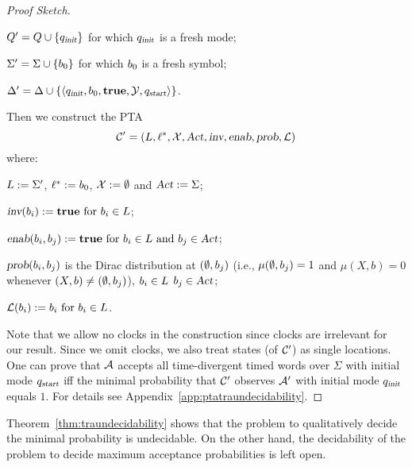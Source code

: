 \begin{proof}[Proof Sketch]
\begin{compactitem}
\item $Q'   = Q  \cup \{ q_{\mbox{\sl\scriptsize init} } \}$ for which $q_{\mbox{\sl\scriptsize init} }$ is a fresh mode;
\item $\Sigma'  = \Sigma \cup \{ b_{0} \}$ for which $b_{0}$ is a fresh symbol;
\item $\Delta'     = \Delta    \cup \{ \langle
            q_{\mbox{\sl\scriptsize init} },
            b_{0},
            \mathbf{true},
            \mathcal{Y},
            q_{\mbox{\sl\scriptsize start}}
        \rangle
    \}$.
\end{compactitem}
Then we construct the PTA
\[
\mathcal{C}'=\left(L, \ell^*, \mathcal{X}, \mbox{\sl Act}, \mbox{\sl inv}, \mbox{\sl enab},  \mbox{\sl prob}, \mathcal{L}\right)
\]
where:
\begin{compactitem}
    \item $L      :=  \Sigma'$, $\ell^*     :=  b_{0} $, $\mathcal{X}    :=  \emptyset $ and $\mbox{\sl Act}      :=  \Sigma $;
    \item $\mbox{\sl inv}(b_{i})              :=  \mathbf{true}
                                            \text{ for }
                                            b_{i} \in L$;
    \item $\mbox{\sl enab}(b_{i},b_{j})   :=  \mathbf{true}
                                            \text{ for }
                                            b_{i} \in L
                                            \text{ and }
                                            b_{j} \in \mbox{\sl Act}$;
    \item $\mbox{\sl prob}(b_{i},b_{j})$ is the Dirac distribution at $(\emptyset,b_{j})$ (i.e., $\mu(\emptyset,b_{j})=1$ and $\mu(X,b)=0$ whenever $(X,b)\ne(\emptyset,b_{j})$),
                                            $b_{i} \in L$
                                            $b_{j} \in \mbox{\sl Act}$;
    \item $\mathcal{L}(b_{i})           :=  b_{i}
                                            \text{ for } b_{i} \in L$.
\end{compactitem}
Note that we allow no clocks in the construction since clocks are irrelevant for our result.
Since we omit clocks, we also treat states (of $\mathcal{C}'$) as single locations.
One can prove that $\mathcal{A}$ accepts all time-divergent timed words over $\Sigma$ with initial mode $q_{\mbox{\sl\scriptsize start}}$ iff
the minimal probability that $\mathcal{C}'$ observes $\mathcal{A}'$ with initial mode $q_{\mbox{\sl\scriptsize init} }$ equals $1$.
For details see Appendix~\ref{app:ptatraundecidability}.
\end{proof}

\begin{remark}
Theorem~\ref{thm:traundecidability} shows that the problem to qualitatively decide the minimal probability is undecidable.
On the other hand, the decidability of the problem to decide maximum acceptance probabilities is left open.
\end{remark}
